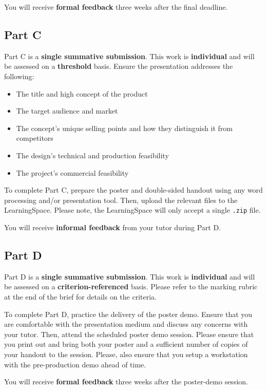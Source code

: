\documentclass{../../fal_assignment}
\begin{document}
You will receive \textbf{formal feedback} three weeks after the final deadline.

\subsection*{Part C}

Part C is a \textbf{single summative submission}. This work is \textbf{individual} and will be assessed on a \textbf{threshold} basis. Ensure the presentation addresses the following:

\begin{itemize}
	\item The title and high concept of the product
	\item The target audience and market
	\item The concept's unique selling points and how they distinguish it from competitors
	\item The design's technical and production feasibility
	\item The project's commercial feasibility
\end{itemize}

To complete Part C, prepare the poster and double-sided handout using any word processing and/or presentation tool. Then, upload the relevant files to the LearningSpace. Please note, the LearningSpace will only accept a single \texttt{.zip} file.

You will receive \textbf{informal feedback} from your tutor during Part D.

\subsection*{Part D}

Part D is a \textbf{single summative submission}. This work is \textbf{individual} and will be assessed on a \textbf{criterion-referenced} basis. Please refer to the marking rubric at the end of the brief for details on the criteria.

To complete Part D, practice the delivery of the poster demo. Ensure that you are comfortable with the presentation medium and discuss any concerns with your tutor. Then, attend the scheduled poster demo session. Please ensure that you print out and bring both your poster and a sufficient number of copies of your handout to the session. Please, also ensure that you setup a workstation with the pre-production demo ahead of time.

You will receive \textbf{formal feedback} three weeks after the poster-demo session.
\end{document}
